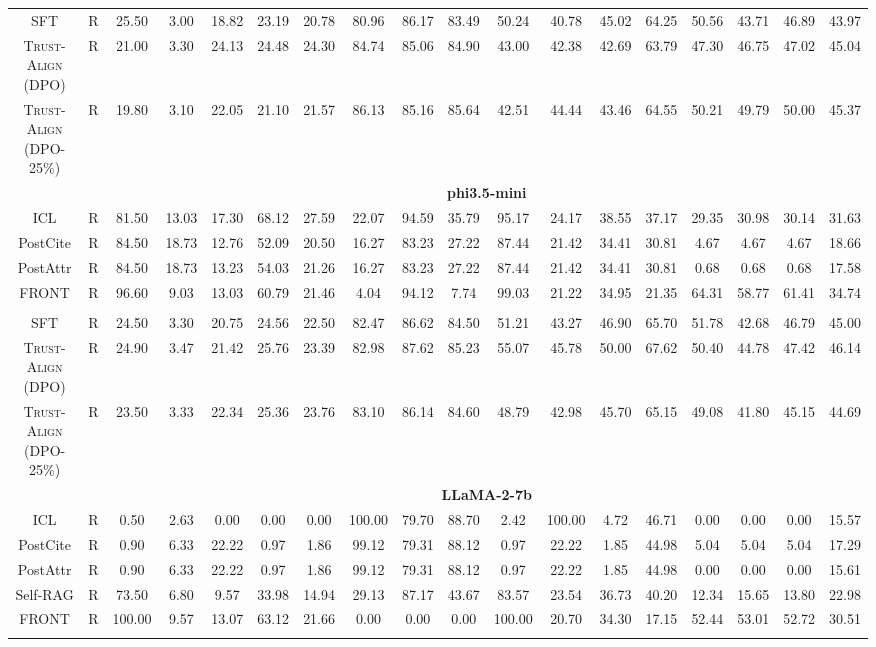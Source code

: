 \documentclass{article} %
\newcommand{\method}[0]{\textsc{Trust-Align}}
\begin{document}
\begin{table}[htb!]
{\begin{tabular}{ccc*{15}c}
SFT & R & 25.50 & 3.00 & 18.82 & 23.19 & 20.78 & 80.96 & 86.17 & 83.49 & 50.24 & 40.78 & 45.02 & 64.25 & 50.56 & 43.71 & 46.89 & 43.97 \\
\method{} (DPO) & R & 21.00 & 3.30 & 24.13 & 24.48 & 24.30 & 84.74 & 85.06 & 84.90 & 43.00 & 42.38 & 42.69 & 63.79 & 47.30 & 46.75 & 47.02 & 45.04 \\
\method{} (DPO-25\%) & R & 19.80 & 3.10 & 22.05 & 21.10 & 21.57 & 86.13 & 85.16 & 85.64 & 42.51 & 44.44 & 43.46 & 64.55 & 50.21 & 49.79 & 50.00 & 45.37 \\ 

& & \multicolumn{16}{c}{\cellcolor[gray]{0.9}\textbf{phi3.5-mini}} \\
ICL & R & 81.50 & 13.03 & 17.30 & 68.12 & 27.59 & 22.07 & 94.59 & 35.79 & 95.17 & 24.17 & 38.55 & 37.17 & 29.35 & 30.98 & 30.14 & 31.63 \\
PostCite & R & 84.50 & 18.73 & 12.76 & 52.09 & 20.50 & 16.27 & 83.23 & 27.22 & 87.44 & 21.42 & 34.41 & 30.81 & 4.67 & 4.67 & 4.67 & 18.66 \\
PostAttr & R & 84.50 & 18.73 & 13.23 & 54.03 & 21.26 & 16.27 & 83.23 & 27.22 & 87.44 & 21.42 & 34.41 & 30.81 & 0.68 & 0.68 & 0.68 & 17.58 \\
FRONT & R & 96.60 & 9.03 & 13.03 & 60.79 & 21.46 & 4.04 & 94.12 & 7.74 & 99.03 & 21.22 & 34.95 & 21.35 & 64.31 & 58.77 & 61.41 & 34.74 \\\\

SFT & R & 24.50 & 3.30 & 20.75 & 24.56 & 22.50 & 82.47 & 86.62 & 84.50 & 51.21 & 43.27 & 46.90 & 65.70 & 51.78 & 42.68 & 46.79 & 45.00 \\
\method{} (DPO) & R & 24.90 & 3.47 & 21.42 & 25.76 & 23.39 & 82.98 & 87.62 & 85.23 & 55.07 & 45.78 & 50.00 & 67.62 & 50.40 & 44.78 & 47.42 & 46.14 \\
\method{} (DPO-25\%) & R & 23.50 & 3.33 & 22.34 & 25.36 & 23.76 & 83.10 & 86.14 & 84.60 & 48.79 & 42.98 & 45.70 & 65.15 & 49.08 & 41.80 & 45.15 & 44.69 \\ 

& & \multicolumn{16}{c}{\cellcolor[gray]{0.9}\textbf{LLaMA-2-7b}} \\
ICL & R & 0.50 & 2.63 & 0.00 & 0.00 & 0.00 & 100.00 & 79.70 & 88.70 & 2.42 & 100.00 & 4.72 & 46.71 & 0.00 & 0.00 & 0.00 & 15.57 \\
PostCite & R & 0.90 & 6.33 & 22.22 & 0.97 & 1.86 & 99.12 & 79.31 & 88.12 & 0.97 & 22.22 & 1.85 & 44.98 & 5.04 & 5.04 & 5.04 & 17.29 \\
PostAttr & R & 0.90 & 6.33 & 22.22 & 0.97 & 1.86 & 99.12 & 79.31 & 88.12 & 0.97 & 22.22 & 1.85 & 44.98 & 0.00 & 0.00 & 0.00 & 15.61 \\
Self-RAG & R & 73.50 & 6.80 & 9.57 & 33.98 & 14.94 & 29.13 & 87.17 & 43.67 & 83.57 & 23.54 & 36.73 & 40.20 & 12.34 & 15.65 & 13.80 & 22.98 \\
FRONT & R & 100.00 & 9.57 & 13.07 & 63.12 & 21.66 & 0.00 & 0.00 & 0.00 & 100.00 & 20.70 & 34.30 & 17.15 & 52.44 & 53.01 & 52.72 & 30.51 \\\\


\end{tabular}}
\end{table}
\end{document}
